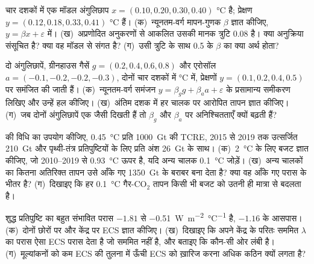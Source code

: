 \begin{exercise}[$\star\star$]\label{exo:b2:anthropogenic-climate-change:9}
चार दशकों में एक मॉडल अंगुलिछाप $x = (0.10, 0.20, 0.30, 0.40)$ \unit{\celsius} है; प्रेक्षण
$y = (0.12, 0.18, 0.33, 0.41)$ \unit{\celsius} हैं। (क)~न्यूनतम-वर्ग मापन-गुणक $\beta$
ज्ञात कीजिए, $y = \beta x + \varepsilon$ में। (ख)~अप्रणोदित अनुकरणों से आकलित उसकी मानक त्रुटि
\num{0.08} है। क्या अनुक्रिया संसूचित है? क्या वह मॉडल से संगत है? (ग)~उसी त्रुटि के साथ
0.5 के $\beta$ का क्या अर्थ होता?
\end{exercise}

\begin{exercise}[$\star\star\star$]\label{exo:b2:anthropogenic-climate-change:10}
दो अंगुलिछापें, ग्रीनहाउस गैसें $g = (0.2, 0.4, 0.6, 0.8)$ और एरोसॉल $a = (-0.1, -0.2,
-0.2, -0.3)$, दोनों चार दशकों में \unit{\celsius} में, प्रेक्षणों $y = (0.1,
0.2, 0.4, 0.5)$ पर समंजित की जाती हैं। (क)~न्यूनतम-वर्ग समंजन $y = \beta_g g + \beta_a a
+ \varepsilon$ के प्रसामान्य समीकरण लिखिए और उन्हें हल कीजिए। (ख)~अंतिम दशक में हर चालक पर आरोपित तापन ज्ञात कीजिए।
(ग)~जब दोनों अंगुलिछापें एक जैसी दिखती हैं तो $\beta_g$ और $\beta_a$ पर अनिश्चितताएँ क्यों बढ़ती हैं?
\end{exercise}

\begin{exercise}[$\star\star\star$]\label{exo:b2:anthropogenic-climate-change:11}
 की विधि का उपयोग कीजिए, \qty{0.45}{\celsius} प्रति \qty{1000}{Gt} की TCRE,
2015 से 2019 तक उत्सर्जित \qty{210}{Gt} और पृथ्वी-तंत्र प्रतिपुष्टियों के लिए प्रति अंश \qty{26}{Gt} के साथ।
(क)~\qty{2}{\celsius} के लिए बजट ज्ञात कीजिए, जो 2010--2019 से \qty{0.93}{\celsius} ऊपर है,
यदि अन्य चालक \qty{0.1}{\celsius} जोड़ें। (ख)~अन्य चालकों का कितना अतिरिक्त तापन उसे आँके गए
\qty{1350}{Gt} के बराबर बना देता है? क्या वह आँके गए परास के भीतर है? (ग)~दिखाइए
कि हर \qty{0.1}{\celsius} गैर-CO$_2$ तापन किसी भी बजट को उतनी ही मात्रा से बदलता है।
\end{exercise}

\begin{exercise}[$\star\star\star$]\label{exo:b2:anthropogenic-climate-change:12}
शुद्ध प्रतिपुष्टि का बहुत संभावित परास $-1.81$ से \qty{-0.51}{W.m^{-2}.\celsius^{-1}} है, $-1.16$ के
आसपास। (क)~दोनों छोरों पर और केंद्र पर ECS ज्ञात कीजिए। (ख)~दिखाइए कि अपने केंद्र के परितः सममित $\lambda$
का परास ऐसा ECS परास देता है जो सममित नहीं है, और बताइए कि कौन-सी ओर लंबी है। (ग)~मूल्यांकनों को
कम ECS की तुलना में ऊँची ECS को ख़ारिज करना अधिक कठिन क्यों लगता है?
\end{exercise}

